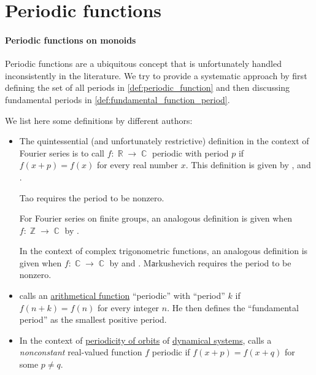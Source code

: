 \section{Periodic functions}\label{sec:periodic_functions}

\paragraph{Periodic functions on monoids}

\begin{remark}\label{rem:periodic_functions_and_periods}
  Periodic functions are a ubiquitous concept that is unfortunately handled inconsistently in the literature. We try to provide a systematic approach by first defining the set of all periods in \cref{def:periodic_function} and then discussing fundamental periods in \cref{def:fundamental_function_period}.

  We list here some definitions by different authors:
  \begin{itemize}
    \item The quintessential (and unfortunately restrictive) definition in the context of Fourier series is to call \( f: \BbbR \to \BbbC \) periodic with period \( p \) if \( f(x + p) = f(x) \) for every real number \( x \). This definition is given by
    \textcite[def. 5.1.1]{Tao2022AnalysisII},
    \textcite[371]{Фихтенгольц1968ОсновыАнализаТом2} and
    \textcite[299]{ИльинСадовничийСендов1987АнализТом2}.

    Tao requires the period to be nonzero.

    For Fourier series on finite groups, an analogous definition is given when \( f: \BbbZ \to \BbbC \) by \textcite[def. 5.1.1]{Steinberg2012RepresentationTheory}.

    In the context of complex trigonometric functions, an analogous definition is given when \( f: \BbbC \to \BbbC \) by \textcite[44]{Ahlfors1979ComplexAnalysis} and \textcite[324]{Маркушевич1967АналитическиеФункцииТом2}. Mаrkushevich requires the period to be nonzero.

    \item \Textcite[157]{Apostol1976AnalyticNumberTheory} calls an \hyperref[def:arithmetic_function]{arithmetical function} \enquote{periodic} with \enquote{period} \( k \) if \( f(n + k) = f(n) \) for every integer \( n \). He then defines the \enquote{fundamental period} as the smallest positive period.

    \item In the context of \hyperref[def:dynamical_system_periodicity]{periodicity of orbits} of \hyperref[def:dynamical_system]{dynamical systems}, \textcite[88]{Müller2022HandbookOfDynamicsAndProbability} calls a \emph{nonconstant} real-valued function \( f \) periodic if \( f(x + p) = f(x + q) \) for some \( p \neq q \).


\end{itemize}
\end{remark}
